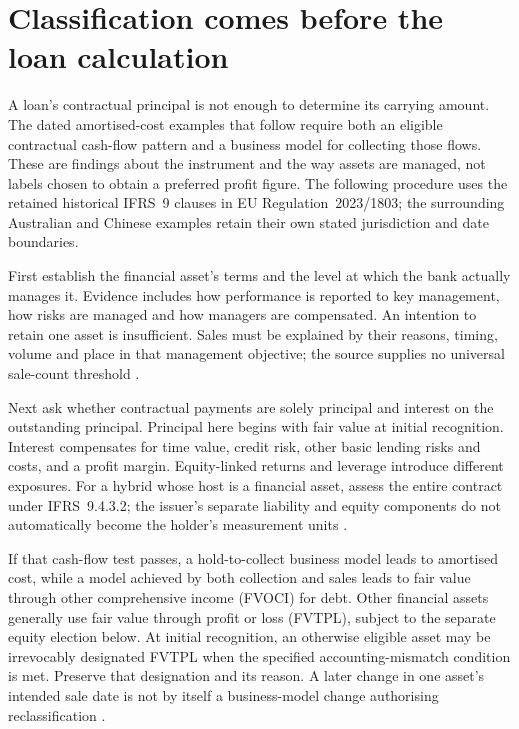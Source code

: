 \section{Classification comes before the loan calculation}
\label{sec:bank-asset-classification}

A loan's contractual principal is not enough to determine its carrying
amount. The dated amortised-cost examples that follow require both an
eligible contractual cash-flow pattern and a business model for collecting
those flows. These are findings about the instrument and the way assets are
managed, not labels chosen to obtain a preferred profit figure. The following
procedure uses the retained historical IFRS~9 clauses in EU
Regulation~2023/1803; the surrounding Australian and Chinese examples retain
their own stated jurisdiction and date boundaries.

First establish the financial asset's terms and the level at which the bank
actually manages it. Evidence includes how performance is reported to key
management, how risks are managed and how managers are compensated. An
intention to retain one asset is insufficient. Sales must be explained by
their reasons, timing, volume and place in that management objective; the
source supplies no universal sale-count threshold
\citep[IFRS~9.4.1.1--3, B4.1.1--4B]{eu20231803}.

Next ask whether contractual payments are solely principal and interest on
the outstanding principal. Principal here begins with fair value at initial
recognition. Interest compensates for time value, credit risk, other basic
lending risks and costs, and a profit margin. Equity-linked returns and
leverage introduce different exposures. For a hybrid whose host is a
financial asset, assess the entire contract under IFRS~9.4.3.2; the issuer's
separate liability and equity components do not automatically become the
holder's measurement units \citep[IFRS~9.4.1.3, 4.3.2, B4.1.7A--9,
B4.1.14]{eu20231803}.

If that cash-flow test passes, a hold-to-collect business model leads to
amortised cost, while a model achieved by both collection and sales leads to
fair value through other comprehensive income (FVOCI) for debt. Other
financial assets generally use fair value through profit or loss (FVTPL),
subject to the separate equity election below. At initial recognition,
an otherwise eligible asset may be irrevocably designated FVTPL when the
specified accounting-mismatch condition is met. Preserve that designation
and its reason. A later change in one asset's intended sale date is not by
itself a business-model change authorising reclassification
\citep[IFRS~9.4.1.2--5, 4.4.1, B4.1.2A--3]{eu20231803}.

